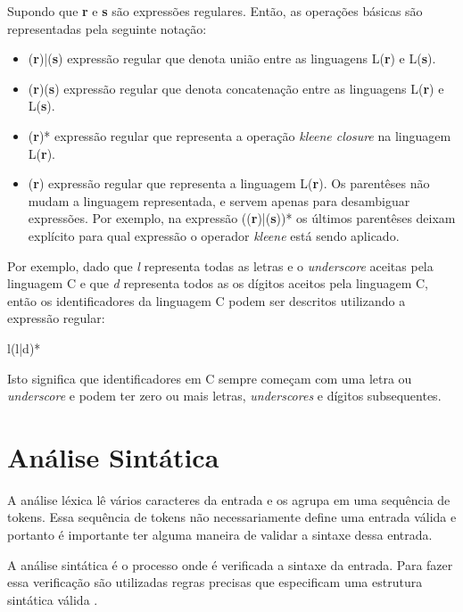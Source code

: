 Supondo que \textbf{r} e \textbf{s} são expressões regulares. Então, as operações básicas 
são representadas pela seguinte notação:

\begin{itemize}
    \item (\textbf{r})|(\textbf{s}) expressão regular que denota união entre as linguagens L(\textbf{r}) e 
    L(\textbf{s}).
    \item (\textbf{r})(\textbf{s}) expressão regular que denota concatenação entre as linguagens L(\textbf{r}) e 
    L(\textbf{s}).
    \item (\textbf{r})* expressão regular que representa a operação \textit{kleene closure} na linguagem L(\textbf{r}).
    \item (\textbf{r}) expressão regular que representa a linguagem L(\textbf{r}). Os parentêses não mudam
    a linguagem representada, e servem apenas para desambiguar expressões. Por exemplo, 
    na expressão ((\textbf{r})|(\textbf{s}))* os últimos parentêses deixam explícito para qual expressão 
    o operador \textit{kleene} está sendo aplicado.
\end{itemize}

Por exemplo, dado que \textit{l} representa todas as letras e o \textit{underscore} 
aceitas pela linguagem C e que \textit{d} representa todos as os dígitos aceitos 
pela linguagem C, então os identificadores da linguagem C podem ser descritos utilizando 
a expressão regular:

\begin{center}
l(l|d)*
\end{center}
Isto significa que identificadores em C sempre começam com uma letra ou \textit{underscore} 
e podem ter zero ou mais letras, \textit{underscores} e dígitos subsequentes.

\section{Análise Sintática}
\label{sec:sintatic}

A análise léxica lê vários caracteres da entrada e os agrupa em uma sequência de tokens. Essa sequência de
tokens não necessariamente define uma entrada válida e portanto é importante ter alguma maneira de
validar a sintaxe dessa entrada.

A análise sintática é o processo onde é verificada a sintaxe da entrada. 
Para fazer essa verificação são utilizadas regras precisas que especificam 
uma estrutura sintática válida \cite{aho2006}.

